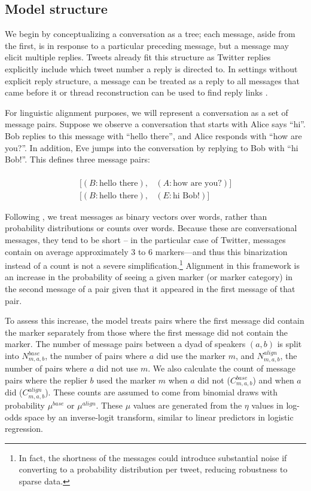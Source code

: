 \documentclass{acm_proc_article-sp}
\begin{document}
\subsection{Model structure}
We begin by conceptualizing a conversation as a tree; each message, aside from the first, is in response to a particular preceding message, but a message may elicit multiple replies. Tweets already fit this structure as Twitter replies explicitly include which tweet number a reply is directed to.  In settings without explicit reply structure, a message can be treated as a reply to all messages that came before it \cite{WangReitterYen2014} or thread reconstruction can be used to find reply links \cite{JonesEtAl2014}.

For linguistic alignment purposes, we will represent a conversation as a set of message pairs. Suppose we observe a conversation that starts with  Alice says ``hi''. Bob replies to this message with ``hello there'', and Alice responds with ``how are you?''. In addition, Eve jumps into the conversation by replying to Bob with ``hi Bob!''.  This defines three message pairs:

\begin{align*}
[(A, \textrm{hi}), & (B: \textrm{hello there})] \\
[(B: \textrm{hello there}), & (A: \textrm{how are you?})] \\
[(B: \textrm{hello there}), & (E: \textrm{hi Bob}!)] 
\end{align*}

Following \cite{DNMGamonDumais2011}, we treat messages as binary vectors over words, rather than probability distributions or counts over words.  Because these are conversational messages, they tend to be short -- in the particular case of Twitter, messages contain on average approximately 3 to 6 markers---and thus this binarization instead of a count is not a severe simplification.\footnote{In fact, the shortness of the messages could introduce substantial noise if converting to a probability distribution per tweet, reducing robustness to sparse data.}  Alignment in this framework is an increase in the probability of seeing a given marker (or marker category) in the second message of a pair given that it appeared in the first message of that pair.

To assess this increase, the model treats pairs where the first message did contain the marker separately from those where the first message did not contain the marker.  The number of message pairs between a dyad of speakers $(a,b)$ is split into $N^{base}_{m,a,b}$, the number of pairs where $a$ did use the marker $m$, and $N^{align}_{m,a,b}$, the number of pairs where $a$ did not use $m$.  We also calculate the count of message pairs where the replier $b$ used the marker $m$ when $a$ did not ($C^{base}_{m,a,b}$) and when $a$ did ($C^{align}_{m,a,b}$).   These counts are assumed to come from binomial draws with probability $\mu^{base}$ or $\mu^{align}$.  These $\mu$ values are generated from the $\eta$ values in log-odds space by an inverse-logit transform, similar to linear predictors in logistic regression.
\end{document}
